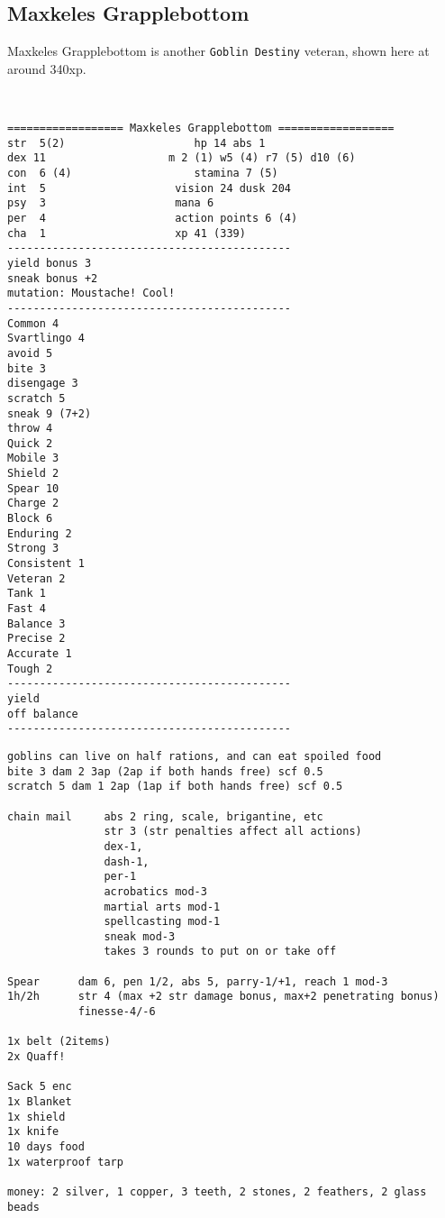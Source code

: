 \clearpage
\begin{samepage}
\subsection*{Maxkeles Grapplebottom}
\noindent Maxkeles Grapplebottom is another \texttt{Goblin Destiny} veteran, shown here at around 340xp.

\

\small \begin{verbatim}
================== Maxkeles Grapplebottom ==================
str  5(2)                    hp 14 abs 1
dex 11                   m 2 (1) w5 (4) r7 (5) d10 (6)
con  6 (4)                   stamina 7 (5)
int  5                    vision 24 dusk 204
psy  3                    mana 6
per  4                    action points 6 (4)
cha  1                    xp 41 (339)
--------------------------------------------
yield bonus 3
sneak bonus +2
mutation: Moustache! Cool!
--------------------------------------------
Common 4
Svartlingo 4
avoid 5
bite 3
disengage 3
scratch 5
sneak 9 (7+2)
throw 4
Quick 2
Mobile 3
Shield 2
Spear 10
Charge 2
Block 6
Enduring 2
Strong 3
Consistent 1
Veteran 2
Tank 1
Fast 4
Balance 3
Precise 2
Accurate 1
Tough 2
--------------------------------------------
yield
off balance
--------------------------------------------
\end{verbatim} \end{samepage} \clearpage \begin{samepage} \begin{verbatim}
goblins can live on half rations, and can eat spoiled food
bite 3 dam 2 3ap (2ap if both hands free) scf 0.5
scratch 5 dam 1 2ap (1ap if both hands free) scf 0.5

chain mail     abs 2 ring, scale, brigantine, etc
               str 3 (str penalties affect all actions)
               dex-1,
               dash-1,
               per-1
               acrobatics mod-3
               martial arts mod-1
               spellcasting mod-1
               sneak mod-3
               takes 3 rounds to put on or take off

Spear      dam 6, pen 1/2, abs 5, parry-1/+1, reach 1 mod-3
1h/2h      str 4 (max +2 str damage bonus, max+2 penetrating bonus)
           finesse-4/-6

1x belt (2items)
2x Quaff!

Sack 5 enc
1x Blanket
1x shield
1x knife
10 days food
1x waterproof tarp

money: 2 silver, 1 copper, 3 teeth, 2 stones, 2 feathers, 2 glass beads
\end{verbatim} \end{samepage} \normalsize






